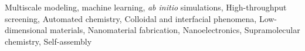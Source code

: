 
\begin{cvparagraph}
  Multiscale modeling, machine learning, \textit{ab initio} simulations,
  High-throughput screening, Automated chemistry, Colloidal and
  interfacial phenomena, Low-dimensional materials, Nanomaterial
  fabrication, Nanoelectronics, Supramolecular chemistry, Self-assembly
\end{cvparagraph}
